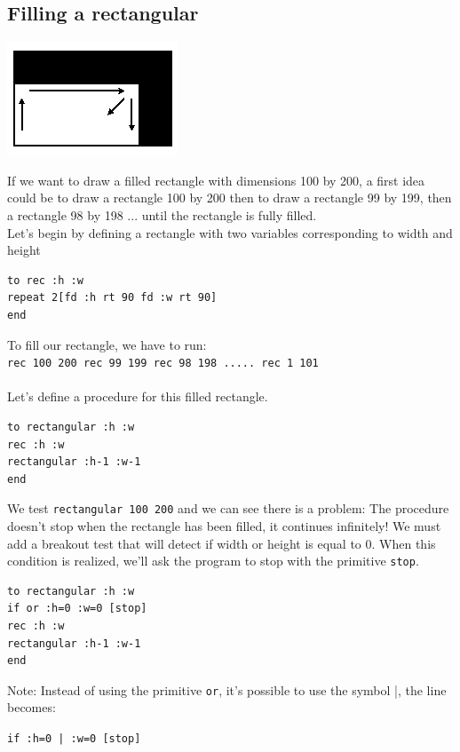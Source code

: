 \subsection{Filling a rectangular}
\begin{center}
\includegraphics{pics/animation-rectangle.png}
\end{center}
\noindent If we want to draw a filled rectangle with dimensions 100 by 200, a first idea could be to draw a rectangle 100 by 200 then to draw a rectangle 99 by 199, then a rectangle 98 by 198 ... until the rectangle is fully filled.  \\
Let's begin by defining a rectangle with two variables corresponding to width and height
\begin{verbatim}
to rec :h :w
repeat 2[fd :h rt 90 fd :w rt 90]
end
\end{verbatim}
To fill our rectangle, we have to run:\\
\texttt{rec 100 200 rec 99 199 rec 98 198  ..... rec 1 101}\\ \\
Let's define a procedure for this filled rectangle.
\begin{verbatim}
to rectangular :h :w
rec :h :w
rectangular :h-1 :w-1
end
\end{verbatim}
We test \texttt{rectangular 100 200} and we can see there is a problem: The procedure doesn't stop when the rectangle has been filled, it continues infinitely! We must add a breakout test that will detect if width or height is equal to 0. When this condition is realized, we'll ask the program to stop with the primitive \texttt{stop}.
\begin{verbatim}
to rectangular :h :w
if or :h=0 :w=0 [stop]
rec :h :w
rectangular :h-1 :w-1
end
\end{verbatim}
Note: Instead of using the primitive \texttt{or}, it's possible to use the symbol |, the line becomes:
 \begin{center}
\texttt{if :h=0 | :w=0 [stop]}
\end{center}
